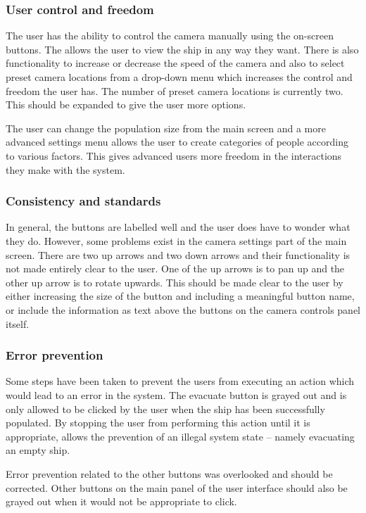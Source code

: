 \subsubsection{User control and freedom}
The user has the ability to control the camera manually using the on-screen buttons. The allows the user to view the ship in any way they want. There is also functionality to increase or decrease the speed of the camera and also to select preset camera locations from a drop-down menu which increases the control and freedom the user has. The number of preset camera locations is currently two. This should be expanded to give the user more options.

The user can change the population size from the main screen and a more advanced settings menu allows the user to create categories of people according to various factors. This gives advanced users more freedom in the interactions they make with the system.

\subsubsection{Consistency and standards}
In general, the buttons are labelled well and the user does have to wonder what they do. However, some problems exist in the camera settings part of the main screen. There are two up arrows and two down arrows and their functionality is not made entirely clear to the user. One of the up arrows is to pan up and the other up arrow is to rotate upwards. This should be made clear to the user by either increasing the size of the button and including a meaningful button name, or include the information as text above the buttons on the camera controls panel itself.

\subsubsection{Error prevention}
Some steps have been taken to prevent the users from executing an action which would lead to an error in the system. The evacuate button is grayed out and is only allowed to be clicked by the user when the ship has been successfully populated. By stopping the user from performing this action until it is appropriate, allows the prevention of an illegal system state -- namely evacuating an empty ship.

Error prevention related to the other buttons was overlooked and should be corrected. Other buttons on the main panel of the user interface should also be grayed out when it would not be appropriate to click.

